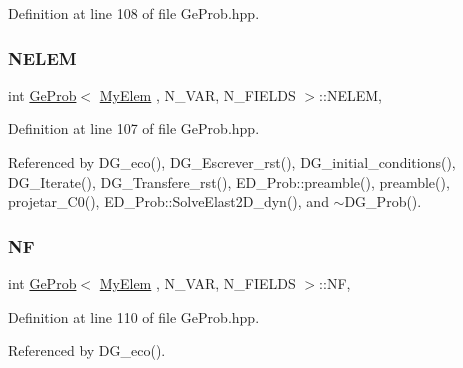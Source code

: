 Definition at line 108 of file Ge\+Prob.\+hpp.

\mbox{\label{classGeProb_ac5a0f21b0737394d783b9ca32317ece8}} 
\subsubsection{\texorpdfstring{N\+E\+L\+EM}{NELEM}}
{\footnotesize\ttfamily int \hyperlink{classGeProb}{Ge\+Prob}$<$ \hyperlink{DG__Prob_8h_a83cd887ced9a6587428f267e50cd4787}{My\+Elem} , N\+\_\+\+V\+AR, N\+\_\+\+F\+I\+E\+L\+DS $>$\+::N\+E\+L\+EM\hspace{0.3cm}{\ttfamily [protected]}, {\ttfamily [inherited]}}



Definition at line 107 of file Ge\+Prob.\+hpp.



Referenced by D\+G\+\_\+eco(), D\+G\+\_\+\+Escrever\+\_\+rst(), D\+G\+\_\+initial\+\_\+conditions(), D\+G\+\_\+\+Iterate(), D\+G\+\_\+\+Transfere\+\_\+rst(), E\+D\+\_\+\+Prob\+::preamble(), preamble(), projetar\+\_\+\+C0(), E\+D\+\_\+\+Prob\+::\+Solve\+Elast2\+D\+\_\+dyn(), and $\sim$\+D\+G\+\_\+\+Prob().

\mbox{\label{classGeProb_a4168b4f9002df61cb396728b9eecbdca}} 
\subsubsection{\texorpdfstring{NF}{NF}}
{\footnotesize\ttfamily int \hyperlink{classGeProb}{Ge\+Prob}$<$ \hyperlink{DG__Prob_8h_a83cd887ced9a6587428f267e50cd4787}{My\+Elem} , N\+\_\+\+V\+AR, N\+\_\+\+F\+I\+E\+L\+DS $>$\+::NF\hspace{0.3cm}{\ttfamily [protected]}, {\ttfamily [inherited]}}



Definition at line 110 of file Ge\+Prob.\+hpp.



Referenced by D\+G\+\_\+eco().

\mbox{\label{classGeProb_ac9a59a8c31ccad50b7eabc436c365391}} 
